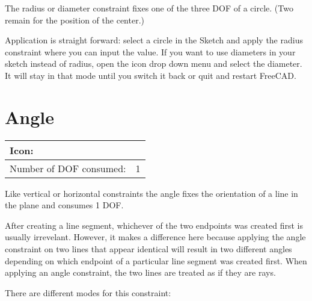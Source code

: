 \documentclass[12pt,titlepage]{article}
\newcommand{\icon}[1]{\raisebox{-1em}{\rule{0pt}{27pt}\texttt{[image: images/\#1]}}}
\newcommand{\dofConsumed}{Number of DOF consumed:}
\begin{document}
The radius or diameter constraint fixes one of the three DOF of a circle. (Two
remain for the position of the center.)

Application is straight forward: select a circle in the Sketch and apply the radius
constraint where you can input the value. If you want to use diameters in your sketch instead of radius,
open the icon drop down menu and select the diameter. It will stay in that
mode until you switch it back or quit and restart FreeCAD.

\section{Angle}
\label{Angle}
\begin{tabular}{|l|l|}
\hline
Icon: & \icon{Constraint_InternalAngle}\\
\hline
\dofConsumed & 1 \\
\hline
\end{tabular}

Like vertical or horizontal constraints the angle fixes the orientation of a
line in the plane and consumes 1 DOF.

After creating a line segment, whichever of the two endpoints was created
first is usually irrevelant.  However, it makes a difference here because
applying the angle constraint on two lines that appear identical will result
in two different angles depending on which endpoint of a particular line
segment was created first.  When applying an angle constraint, the two lines
are treated as if they are rays.

There are different modes for this constraint:
\end{document}
